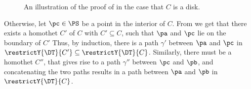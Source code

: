 \begin{figure}[h]
                \hfill%
                \phantom{}%
                \caption{An illustration of the proof of
                         in the case that $C$ is a disk.}
        \end{figure}
        
        Otherwise, let $\pc\in \PS$ be a point in the interior of
        $C$. From  we get that there exists a
        homothet $C'$ of $C$ with $C'\subseteq C$, such that $\pa$ and
        $\pc$ lie on the boundary of $C'$ Thus, by induction, there is
        a path $\gamma'$ between $\pa$ and $\pc$ in
        $\restrictY{\DT}{C'} \subseteq \restrictY{\DT}{C}$. Similarly,
        there must be a homothet $C''$, that gives rise to a path
        $\gamma''$ between $\pc$ and $\pb$, and concatenating the two
        paths results in a path between $\pa$ and $\pb$ in
        $\restrictY{\DT}{C}$.
